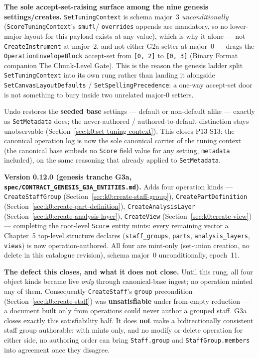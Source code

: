 \documentclass[11pt,letterpaper]{report}
\newcommand{\sectionsc}[1]{{\addfontfeatures{Letters=SmallCaps}#1}}
\begin{document}
\textbf{The sole accept-set-raising surface among the nine genesis
settings/creates.} \texttt{SetTuningContext} is schema major~3
\emph{unconditionally} (\texttt{ScoreTuningContext}'s \texttt{smufl}/
\texttt{overrides} appends are mandatory, so no lower-major layout for this
payload exists at any value), which is why it alone --- not
\texttt{CreateInstrument} at major~2, and not either G2a setter at major~0 ---
drags the \texttt{OperationEnvelopeBlock} accept-set from \texttt{[0, 2]} to
\texttt{[0, 3]} (Binary Format companion \sectionsc{The Chunk-Level Gate}).
This is the reason the genesis ladder split \texttt{SetTuningContext} into
its own rung rather than landing it alongside \texttt{SetCanvasLayoutDefaults}
/ \texttt{SetSpellingPrecedence}: a one-way accept-set door is not something
to bury inside two unrelated major-0 setters.

Undo restores the \textbf{seeded base} settings --- default or non-default
alike --- exactly as \texttt{SetMetadata} does; the never-authored /
authored-to-default distinction stays unobservable
(Section~\ref{sec:k0:set-tuning-context}). This closes P13-S13: the
canonical operation log is now the sole canonical carrier of the tuning
context (the canonical base embeds no \texttt{Score} field value for any
setting, \texttt{metadata} included), on the same reasoning that already
applied to \texttt{SetMetadata}.

\medskip

\noindent\textbf{Version 0.12.0 (genesis tranche G3a,
\texttt{spec/CONTRACT\_GENESIS\_G3A\_ENTITIES.md}).} Adds four operation
kinds --- \texttt{CreateStaffGroup} (Section~\ref{sec:k0:create-staff-group}),
\texttt{CreatePartDefinition} (Section~\ref{sec:k0:create-part-definition}),
\texttt{CreateAnalysisLayer} (Section~\ref{sec:k0:create-analysis-layer}),
\texttt{CreateView} (Section~\ref{sec:k0:create-view}) --- completing the
root-level \texttt{Score} entity mints: every remaining vector a Chapter~5
top-level structure declares (\texttt{staff\_groups}, \texttt{parts},
\texttt{analysis\_layers}, \texttt{views}) is now operation-authored. All
four are mint-only (set-union creation, no delete in this catalogue
revision), schema major~0 unconditionally, epoch~11.

\textbf{The defect this closes, and what it does not close.} Until this
rung, all four object kinds became live \emph{only} through canonical-base
ingest; no operation minted any of them. Consequently \texttt{CreateStaff}'s
\texttt{group} precondition (Section~\ref{sec:k0:create-staff}) was
\textbf{unsatisfiable} under from-empty reduction --- a document built only
from operations could never author a grouped staff. G3a closes exactly this
satisfiability half. It does \textbf{not} make a bidirectionally consistent
staff group authorable: with mints only, and no modify or delete operation
for either side, no authoring order can bring \texttt{Staff.group} and
\texttt{StaffGroup.members} into agreement once they disagree.
\end{document}
